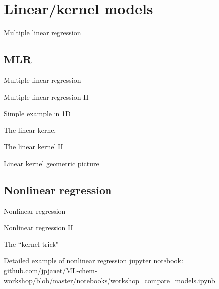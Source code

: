 \section{Linear/kernel models}
\begin{frame}[t]{Multiple linear regression}

\end{frame}
\subsection{MLR}
\begin{frame}[t]{Multiple linear regression}

\end{frame}
\begin{frame}[t]{Multiple linear regression II}

\end{frame}
\begin{frame}[t]{Simple example in 1D}

\end{frame}

%

\begin{frame}{The linear kernel}

\end{frame}
\begin{frame}{The linear kernel II}

\end{frame}
\begin{frame}{Linear kernel geometric picture}

\end{frame}
\subsection{Nonlinear regression}
\begin{frame}[t]{Nonlinear regression}

\end{frame}
\begin{frame}[t]{Nonlinear regression II}

\end{frame}
\begin{frame}[t]{The ``kernel trick"}

\end{frame}
\begin{frame}[t]{Detailed example of nonlinear regression}
jupyter notebook: \url{github.com/jpjanet/ML-chem-workshop/blob/master/notebooks/workshop_compare_models.ipynb}
\end{frame}

